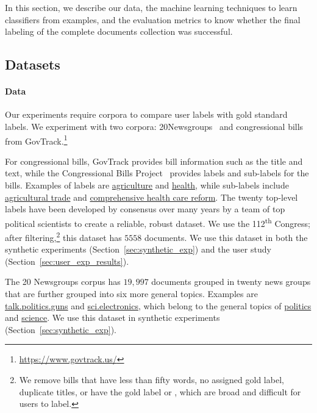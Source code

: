 
In this section, we describe our data, the machine learning techniques
to learn classifiers from examples, and the evaluation metrics to know
whether the final labeling of the complete documents collection was
successful.

\subsection{Datasets}
\label{sub:data}

\paragraph {Data}

Our experiments require corpora to compare user labels with gold
standard labels. We experiment with two corpora:
20Newsgroups~\cite{20news} and  congressional
bills from GovTrack.\footnote{\url{https://www.govtrack.us/}}
















For  congressional bills, GovTrack provides bill information
such as the title and text, while the Congressional Bills
Project~\cite{adler2006congressional} provides labels and sub-labels
for the bills. Examples of labels are \underline{agriculture} and
\underline{health}, while sub-labels include \underline{agricultural
  trade} and \underline{comprehensive health care reform}.  The
twenty top-level labels have been developed by consensus over many
years by a team of top political scientists to create a reliable,
robust dataset.  We use the 112\textsuperscript{th} Congress; after
filtering,\footnote{We remove bills that have less than fifty words, no
  assigned gold label, duplicate titles, or have the gold label
   or , which are
  broad and difficult for users to label.} this dataset has $5558$
documents.  We use this dataset in both the synthetic experiments
(Section~\ref{sec:synthetic_exp}) and the user study
(Section~\ref{sec:user_exp_results}).


 

The 20 Newsgroups corpus has $19,997$ documents grouped in twenty news
groups that are further grouped into six more general topics. Examples
are \underline{talk.politics.guns} and \underline{sci.electronics},
which belong to the general topics of \underline{politics} and
\underline{science}.  We use this dataset in synthetic experiments
(Section~\ref{sec:synthetic_exp}).

